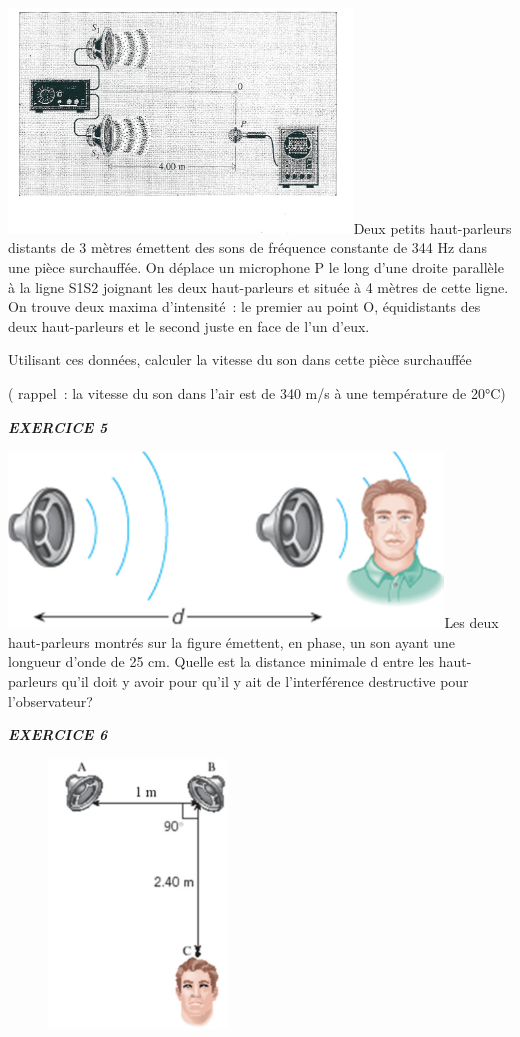 {\includegraphics[width=9.146cm,height=5.973cm]{Pictures/100000010000062500000404B4675BF2C4CE1EEC.png}Deux
petits haut-parleurs distants de 3 mètres émettent des sons de fréquence
constante de 344 Hz dans une pièce surchauffée. On déplace un microphone
P le long d'une droite parallèle à la ligne S1S2 joignant les deux
haut-parleurs et située à 4 mètres de cette ligne. On trouve deux maxima
d'intensité~: le premier au point O, équidistants des deux haut-parleurs
et le second juste en face de l'un d'eux.

Utilisant ces données, calculer la vitesse du son dans cette pièce
surchauffée

( rappel~: la vitesse du son dans l'air est de 340 m/s à une température
de 20°C)

\emph{\textbf{EXERCICE 5}}

\includegraphics[width=11.546cm,height=4.688cm]{Pictures/1000000100000363000001603D3E7105AB252F90.png}Les
deux haut-parleurs montrés sur la figure émettent, en phase, un son
ayant une longueur d'onde de 25 cm. Quelle est la distance minimale d
entre les haut-parleurs qu'il doit y avoir pour qu'il y ait de
l'interférence destructive pour l'observateur?

\emph{\textbf{EXERCICE 6}}

\begin{figure}
\centering
\includegraphics[width=4.757cm,height=7.147cm]{Pictures/10000001000001BA00000298E2F6E319C348E061.png}
\caption{}
\end{figure}

}
